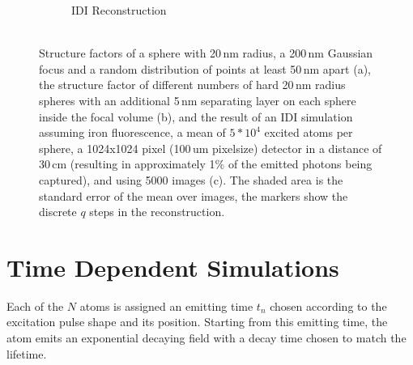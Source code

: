 \begin{figure}
\begin{subfigure}[b]{0.32\textwidth}
		\caption{IDI Reconstruction \\ $ $}
		\label{fig:multisphere2}
	\end{subfigure}
\caption[Structure factors and reconstructions for multiple spherical samples]{Structure factors of a sphere with 20\,nm radius, a 200\,nm Gaussian focus and a random distribution of points at least 50\,nm apart (a), the structure factor of different numbers of hard 20\,nm radius spheres with an additional 5\,nm separating layer on each sphere inside the focal volume (b), and the result of an IDI simulation assuming iron fluorescence, a mean of $5*10^4$ excited atoms per sphere, a 1024x1024 pixel (100\,um pixelsize) detector in a distance of 30\,cm (resulting in approximately 1\% of the emitted photons being captured), and using 5000 images (c). The shaded area is the standard error of the mean over images, the markers show the discrete $q$ steps in the reconstruction.}

\end{figure}

\section{Time Dependent Simulations}
\label{sec:timedependend}
Each of the $N$ atoms is assigned an emitting time $t_{n}$ chosen according to the excitation pulse shape and its position. Starting from this emitting time, the atom emits an exponential decaying field with a decay time chosen to match the lifetime. 



